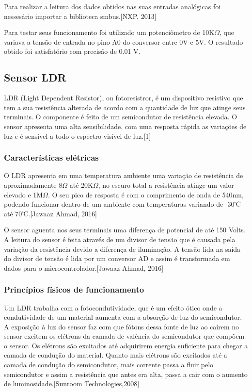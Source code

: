 Para realizar a leitura dos dados obtidos nas suas entradas analógicas foi nessesário importar a biblioteca smbus.[NXP, 2013]

Para testar seus funcionamento foi utilizado um potenciômetro de 10K$\Omega$, que variava a tensão de entrada no pino A0 do conversor entre 0V e 5V. O resultado obtido foi satisfatório com precisão de 0.01 V.


\subsection{Sensor LDR}

LDR (Light Dependent Resistor), ou fotoresistror, é um dispositivo resistivo que tem a sua resistência alterada de acordo com a quantidade de luz que atinge seus terminais. O componente é feito de um semicondutor de resistência elevada. O sensor apresenta uma alta sensibilidade, com uma resposta rápida as variações de luz e é sensível a todo o espectro visível de luz.[1]

\subsubsection{Características elétricas}

O LDR apresenta em uma temperatura ambiente uma variação de resistência de aproximadamente 8$\Omega$ até 20K$\Omega$, no escuro total a resistência atinge um valor elevado e 1M$\Omega$. O seu pico de resposta é com o comprimento de onda de 540nm, podendo funcionar dentro de um ambiente com temperaturas variando de -30℃ até 70℃.[Jawaaz Ahmad, 2016]

O sensor aguenta nos seus terminais uma diferença de potencial de até 150 Volts. A leitura do sensor é feita através de um divisor de tensão que é causada pela variação da resistência devido a diferença de iluminação. A tensão lida na saída do divisor de tensão é lida por um conversor AD e assim é transformada em dados para o microcontrolador.[Jawaaz Ahmad, 2016]

\subsubsection{Princípios físicos de funcionamento}

Um LDR trabalha com a fotocondutividade, que é um efeito ótico onde a condutividade de um material aumenta com a absorção de luz do semicondutor. A exposição à luz do sensor faz com que fótons dessa fonte de luz ao caírem no sensor excitem os elétrons da camada de valência do semicondutor que compõem o sensor. Os elétrons são excitados até adquirirem energia suficiente para chegar a camada de condução do material. Quanto mais elétrons são excitados até a camada de condução do semicondutor, mais corrente passa a fluir pelo semicondutor e assim a resistência que antes era alta, passa a cair com o aumento de luminosidade.[Sunroom Technologies,2008]

